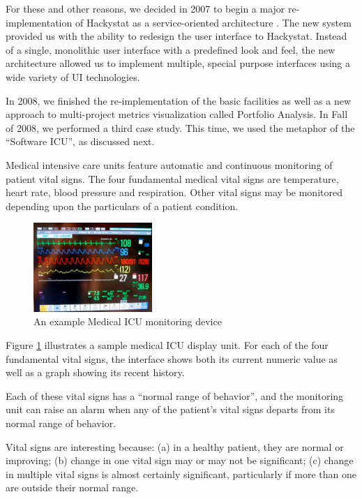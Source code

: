 \documentclass[10pt,twocolumn]{article}
\begin{document}
For these and other reasons, we decided in 2007 to begin a major
re-implementation of Hackystat as a service-oriented architecture
\cite{csdl2-09-07}. The new system provided us with the ability to redesign
the user interface to Hackystat.  Instead of a single, monolithic user
interface with a predefined look and feel, the new architecture allowed us
to implement multiple, special purpose interfaces using a wide variety of
UI technologies.  

In 2008, we finished the re-implementation of the basic facilities as well
as a new approach to multi-project metrics visualization called Portfolio
Analysis.  In Fall of 2008, we performed a third case study. This time, we
used the metaphor of the ``Software ICU'', as discussed next.

\label{sec:icu}

Medical intensive care units feature automatic and continuous monitoring of
patient vital signs.  The four fundamental medical vital signs are
temperature, heart rate, blood pressure and respiration.  Other vital signs
may be monitored depending upon the particulars of a patient condition.

\begin{figure}[ht]
  \center
  \includegraphics[width=0.4\textwidth]{micu-screen.eps}
  \caption{An example Medical ICU monitoring device}
  \label{fig:micu}
\end{figure} 

Figure \ref{fig:micu} illustrates a sample medical ICU display unit. For
each of the four fundamental vital signs, the interface shows both its
current numeric value as well as a graph showing its recent history.  

Each of these vital signs has a ``normal range of behavior'', and the
monitoring unit can raise an alarm when any of the patient's vital signs departs
from its normal range of behavior.

Vital signs are interesting because: (a) in a healthy patient, they are
normal or improving; (b) change in one vital sign may or may not be
significant; (c) change in multiple vital signs is almost certainly
significant, particularly if more than one are outside their normal range.
\end{document}
